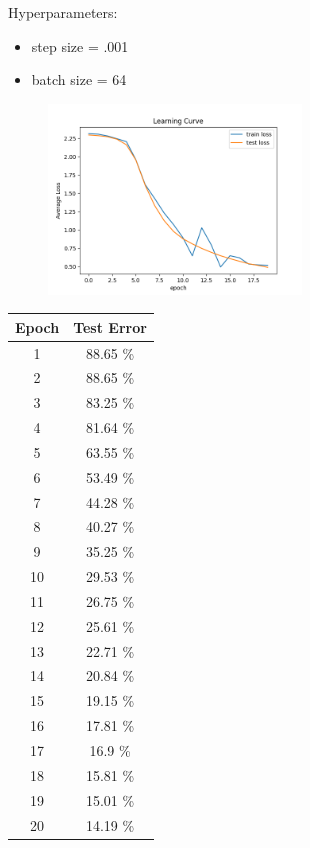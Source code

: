 \documentclass[a4paper]{article}
\theoremstyle{definition}
\newenvironment{soln}{
    \leavevmode\color{blue}\ignorespaces
}{}
\begin{document}
\begin{enumerate}
\begin{soln}
        Hyperparameters:
        \begin{itemize}
            \item step size = .001
            \item batch size = 64
        \end{itemize}
        
        \begin{figure}[H]
			\centering
			\includegraphics[width=0.6\textwidth]{../figs/pytorch_learning_curve.png}
		\end{figure}
       
        \begin{center}
            \begin{tabular}{c | c}
                Epoch & Test Error \\ \hline
                1 & 88.65 \% \\
                2 & 88.65 \% \\
                3 & 83.25 \% \\
                4 & 81.64 \% \\
                5 & 63.55 \% \\
                6 & 53.49 \% \\
                7 & 44.28 \% \\
                8 & 40.27 \% \\
                9 & 35.25 \% \\
                10 & 29.53 \% \\
                11 & 26.75 \% \\
                12 & 25.61 \% \\
                13 & 22.71 \% \\
                14 & 20.84 \% \\
                15 & 19.15 \% \\
                16 & 17.81 \% \\
                17 & 16.9 \% \\
                18 & 15.81 \% \\
                19 & 15.01 \% \\
                20 & 14.19 \% \\
            \end{tabular}
        \end{center}
    \end{soln}


\end{enumerate}
\end{document}
